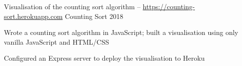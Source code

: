 \begin{cventries}
  \cventry
  {Visualisation of the counting sort algorithm -- \url{https://counting-sort.herokuapp.com}} %
  {Counting Sort} %
  {} %
  {2018} %
  {
    \begin{cvitems} %
      \item {Wrote a counting sort algorithm in JavaScript; built a visualisation using only vanilla JavaScript and HTML/CSS}
      \item {Configured an Express server to deploy the visualisation to Heroku}
    \end{cvitems}
  }

\end{cventries}
